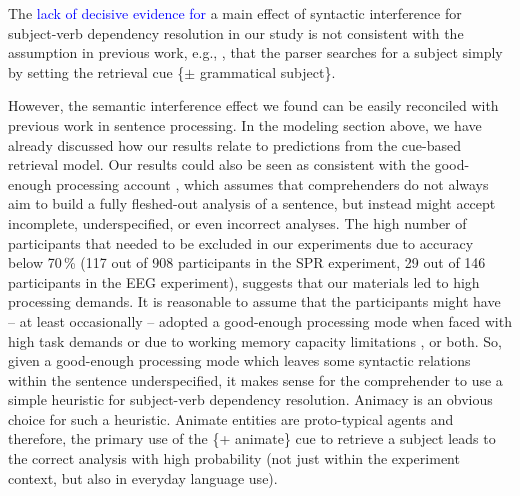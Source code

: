 \documentclass[a4paper, man, floatsintext]{apa7}
\begin{document}
The \textcolor{blue}{lack of decisive evidence for} a main effect of syntactic interference for subject-verb dependency resolution in our study is not consistent with the assumption in previous work, e.g., \textcite{vandyke07,mertzen}, that the parser searches for a subject simply by setting the retrieval cue \{$\pm$ grammatical subject\}. \label{future_work} 

However, the semantic interference effect we found can be easily reconciled with previous work in  sentence processing. In the modeling section above, we have already discussed how our results relate to predictions from the \citet{Lewis2005} cue-based retrieval model.  
 Our results could also be seen as consistent with the good-enough processing account \citep{ferreira2007goodenough}, which assumes that comprehenders do not always aim to build a fully fleshed-out analysis of a sentence, but instead might accept incomplete, underspecified, or even incorrect analyses. The high number of participants that needed to be excluded in our experiments due to accuracy below 70\,\% (117 out of 908 participants in the SPR experiment, 29 out of 146 participants in the EEG experiment), suggests that our materials led to high processing demands. It is reasonable to assume that the participants might have -- at least occasionally -- adopted a good-enough processing mode when faced with high task demands \parencite{swets2008underspecification,LogacevMultiple,LogacevVasishthQJEP2016} or due to working memory capacity limitations \parencite{MalsburgVasishth2013}, or both. So, given a good-enough processing mode which leaves some syntactic relations within the sentence underspecified, it makes sense for the comprehender to use a simple heuristic for subject-verb dependency resolution. Animacy is an obvious choice for such a heuristic. Animate entities are proto-typical agents \citep{dowty1991thematic} and therefore, the primary use of the \{+ animate\} cue to retrieve a subject leads to the correct analysis with high probability (not just within the experiment context, but also in everyday language use). 
 
\end{document}
